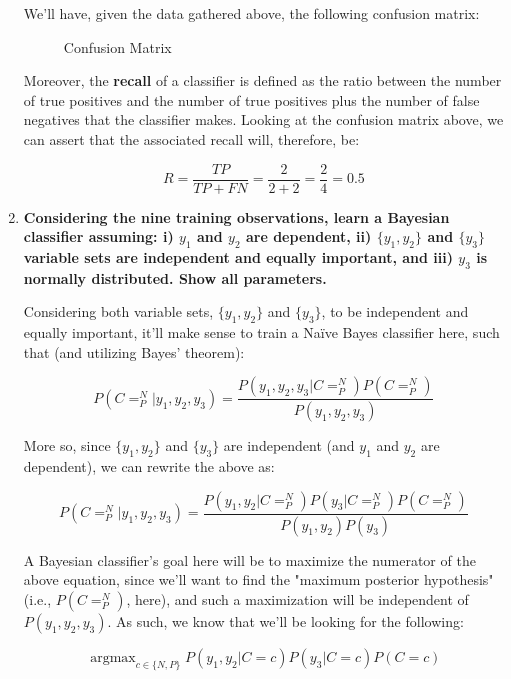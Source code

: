 \documentclass[12pt]{article}
\begin{document}
\begin{enumerate}[leftmargin=\labelsep]
        We'll have, given the data gathered above, the following confusion matrix:

        \begin{figure}[H]
          \centering
          
          \caption{Confusion Matrix}
        \end{figure}

        Moreover, the \textbf{recall} of a classifier is defined as the ratio between the number of
        true positives and the number of true positives plus the number of false negatives that the
        classifier makes. Looking at the confusion matrix above, we can assert that the associated
        recall will, therefore, be:

        $$
          R = \frac{TP}{TP + FN} = \frac{2}{2 + 2} = \frac{2}{4} = 0.5
        $$

        \pagebreak

  \item \textbf{Considering the nine training observations, learn a Bayesian classifier assuming:
          i) $y_1$ and $y_2$ are dependent, ii) $\{y_1 , y_2\}$ and $\{y_3 \}$ variable sets are
          independent and equally important, and iii) $y_3$ is normally distributed. Show all parameters.}

        Considering both variable sets, $\{y_1, y_2\}$ and $\{y_3\}$, to be independent and equally important,
        it'll make sense to train a Naïve Bayes classifier here, such that (and utilizing
        Bayes' theorem):

        $$
          P(C = ^N_P | y_1, y_2, y_3) = \frac{P(y_1, y_2, y_3 | C = ^N_P) P(C = ^N_P)}{P(y_1, y_2, y_3)}
        $$

        More so, since $\{y_1, y_2\}$ and $\{y_3\}$ are independent (and $y_1$ and $y_2$ are dependent),
        we can rewrite the above as:

        $$
          P(C = ^N_P | y_1, y_2, y_3) = \frac{P(y_1, y_2 | C = ^N_P) P(y_3 | C = ^N_P) P(C = ^N_P)}{P(y_1, y_2) P(y_3)}
        $$

        A Bayesian classifier's goal here will be to maximize the numerator of the above equation,
        since we'll want to find the "maximum posterior hypothesis" (i.e., $P(C = ^N_P)$, here), and
        such a maximization will be independent of $P(y_1, y_2, y_3)$. As such, we know that
        we'll be looking for the following:

        $$
          \operatorname{argmax}_{c \in \{N, P\}} P(y_1, y_2 | C = c) P(y_3 | C = c) P(C = c)
        $$


\end{enumerate}
\end{document}
